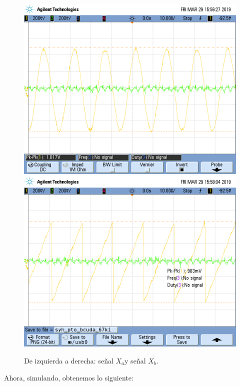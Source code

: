\documentclass[../../ASSD_TP1_G7.tex]{subfiles}
\begin{document}
\begin{figure}[H]

\begin{centering}
\includegraphics[scale=0.25]{Imagenes/syh_pto_bsin_67k}\includegraphics[scale=0.25]{Imagenes/syh_pto_bcuda_67k1}\caption{De izquierda a derecha: señal $X_{a}$y señal $X_{b}$.}
\par\end{centering}
\end{figure}

Ahora, simulando, obtenemos lo siguiente:
\end{document}

